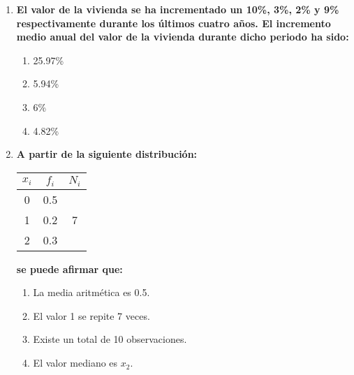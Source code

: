 \documentclass[fleqn]{article}
\begin{document}
\begin{enumerate}
\begin{enumerate}
                                \item \textbf{El valor de la vivienda se ha incrementado un 10\%, 3\%, 2\% y 9\% respectivamente durante los últimos 
                                        cuatro años. El incremento medio anual del valor de la vivienda durante dicho periodo ha sido:}
                                        \begin{enumerate}
                                                \item 25.97\%
                                                \item 5.94\%
                                                \item 6\%
                                                \item 4.82\%
                                        \end{enumerate}

                                \item \textbf{A partir de la siguiente distribución:}
                                        \begin{center}
                                                \begin{tabular}{c|c|c}
                                                        $x_i$ & $f_i$ & $N_i$ \\
                                                        \hline
                                                        0 & 0.5 & \\
                                                        \hline
                                                        1 & 0.2 & 7 \\
                                                        \hline
                                                        2 & 0.3 & \\
                                                \end{tabular}
                                        \end{center}
                                        \textbf{se puede afirmar que:}
                                        \begin{enumerate}
                                                \item La media aritmética es 0.5.
                                                \item El valor 1 se repite 7 veces.
                                                \item Existe un total de 10 observaciones.
                                                \item El valor mediano es $x_2$.
                                        \end{enumerate}
                                

\end{enumerate}
\end{enumerate}
\end{document}
